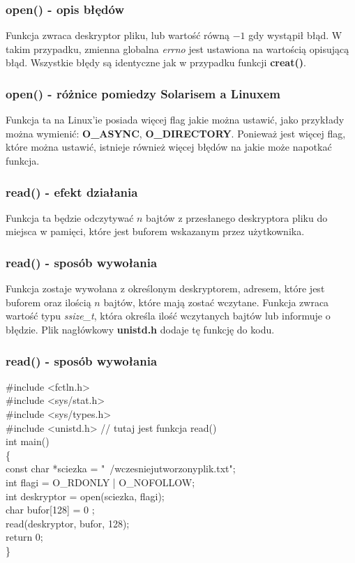 \documentclass{beamer}
\begin{document}
\begin{frame}
	\frametitle{open() - opis błędów}
Funkcja zwraca deskryptor pliku, lub wartość równą $-1$ gdy wystąpił błąd.
W takim przypadku, zmienna globalna \textit{errno} jest ustawiona na wartością opisującą błąd.
Wszystkie błędy są identyczne jak w przypadku funkcji \textbf{creat()}.
\end{frame}

\begin{frame}
	\frametitle{open() - różnice pomiedzy Solarisem a Linuxem}
Funkcja ta na Linux'ie posiada więcej flag jakie można ustawić, jako przykłady można wymienić: \textbf{O\_ASYNC}, \textbf{O\_DIRECTORY}.
Ponieważ jest więcej flag, które można ustawić, istnieje również więcej błędów na jakie może napotkać funkcja. 
\end{frame}

\begin{frame}
	\frametitle{read() - efekt działania}
Funkcja ta będzie odczytywać $n$ bajtów z przesłanego deskryptora pliku do miejsca w pamięci,
które jest buforem wskazanym przez użytkownika.
\end{frame}

\begin{frame}
	\frametitle{read() - sposób wywołania}
Funkcja zostaje wywołana z określonym deskryptorem, adresem, które jest buforem oraz ilością $n$ bajtów, które mają zostać wczytane. Funkcja zwraca wartość typu \textit{ssize\_t}, która określa ilość wczytanych bajtów lub informuje o błędzie.
Plik nagłówkowy \textbf{unistd.h} dodaje tę funkcję do kodu.
\end{frame}

\begin{frame}
	\frametitle{read() - sposób wywołania}
\#include <fctln.h>\\
\#include <sys/stat.h>\\
\#include <sys/types.h>\\
\#include <unistd.h> // tutaj jest funkcja read()\\
int main()\\
\{\\
	const char *sciezka = "~/wczesniejutworzonyplik.txt";\\
	int flagi = O\_RDONLY | O\_NOFOLLOW;\\
	int deskryptor = open(sciezka, flagi);\\
	char bufor[128] = { 0 };\\
	read(deskryptor, bufor, 128);\\
	return 0;\\
\}
\end{frame}
\end{document}
